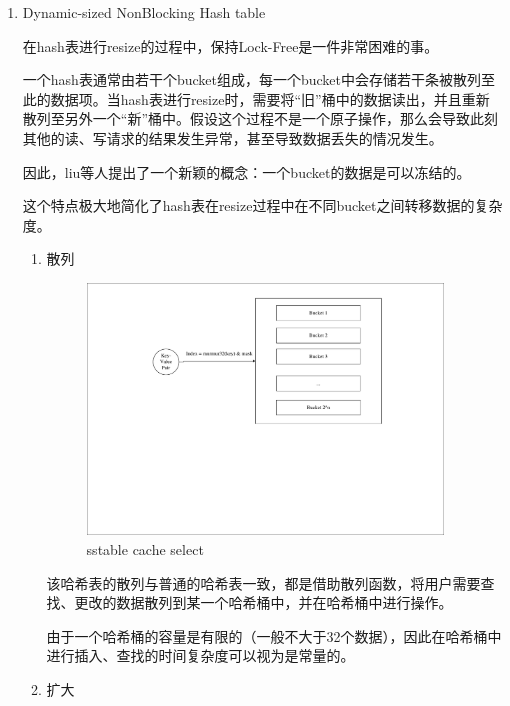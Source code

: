 \begin{enumerate}
			\item Dynamic-sized NonBlocking Hash table
			
			在hash表进行resize的过程中，保持Lock-Free是一件非常困难的事。

一个hash表通常由若干个bucket组成，每一个bucket中会存储若干条被散列至此的数据项。当hash表进行resize时，需要将“旧”桶中的数据读出，并且重新散列至另外一个“新”桶中。假设这个过程不是一个原子操作，那么会导致此刻其他的读、写请求的结果发生异常，甚至导致数据丢失的情况发生。

因此，liu等人提出了一个新颖的概念：一个bucket的数据是可以冻结的。

这个特点极大地简化了hash表在resize过程中在不同bucket之间转移数据的复杂度。

			\begin{enumerate}
				\item 散列 
				
				\begin{figure}[H]
					\centering
					\includegraphics[width=0.95\textwidth]{pdf/cache_select.pdf}
					\caption{sstable cache select}
					\label{sstable_cache_select}
				\end{figure}
				该哈希表的散列与普通的哈希表一致，都是借助散列函数，将用户需要查找、更改的数据散列到某一个哈希桶中，并在哈希桶中进行操作。

由于一个哈希桶的容量是有限的（一般不大于32个数据），因此在哈希桶中进行插入、查找的时间复杂度可以视为是常量的。

				
				\item 扩大
				

\end{enumerate}
\end{enumerate}
